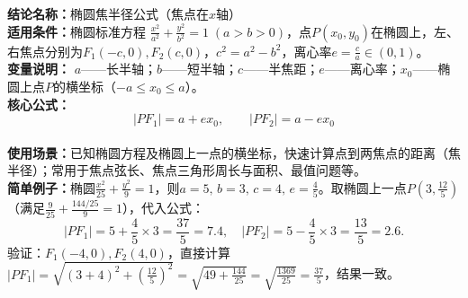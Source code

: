 \textbf{结论名称：}椭圆焦半径公式（焦点在\(x\)轴）\\
\textbf{适用条件：}椭圆标准方程 \(\displaystyle \frac{x^{2}}{a^{2}}+\frac{y^{2}}{b^{2}}=1\;(a>b>0)\)，点\(P(x_0,y_0)\)在椭圆上，左、右焦点分别为\(F_1(-c,0),F_2(c,0)\)，\(c^{2}=a^{2}-b^{2}\)，离心率\(e=\frac{c}{a}\in(0,1)\)。\\
\textbf{变量说明：} \(a\)——长半轴；\(b\)——短半轴；\(c\)——半焦距；\(e\)——离心率；\(x_0\)——椭圆上点\(P\)的横坐标（\(-a\le x_0\le a\)）。\\
\textbf{核心公式：}\[
\boxed{|PF_1| = a + e x_0,\qquad |PF_2| = a - e x_0}
\]\\
\textbf{使用场景：}已知椭圆方程及椭圆上一点的横坐标，快速计算点到两焦点的距离（焦半径）；常用于焦点弦长、焦点三角形周长与面积、最值问题等。\\
\textbf{简单例子：}椭圆\(\frac{x^{2}}{25}+\frac{y^{2}}{9}=1\)，则\(a=5,\,b=3,\,c=4,\,e=\frac{4}{5}\)。取椭圆上一点\(P(3,\frac{12}{5})\)（满足\(\frac{9}{25}+\frac{144/25}{9}=1\)），代入公式：
\[
|PF_1|=5+\frac{4}{5}\times3=\frac{37}{5}=7.4,\quad 
|PF_2|=5-\frac{4}{5}\times3=\frac{13}{5}=2.6.
\]
验证：\(F_1(-4,0),F_2(4,0)\)，直接计算
\(|PF_1|=\sqrt{(3+4)^2+(\frac{12}{5})^2}=\sqrt{49+\frac{144}{25}}=\sqrt{\frac{1369}{25}}=\frac{37}{5}\)，结果一致。
